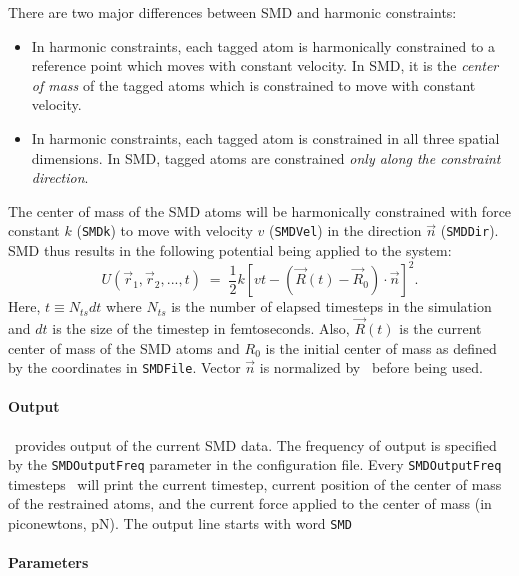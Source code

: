 There are two major differences between SMD and
harmonic constraints:
\begin{itemize}
\item In harmonic constraints, each tagged atom is harmonically constrained
  to a reference point which moves with constant velocity.  In SMD, it is
  the {\em center of mass} of the tagged atoms which is constrained to move
  with constant velocity.

\item In harmonic constraints, each tagged atom is constrained in all three
  spatial dimensions.  In SMD, tagged atoms are constrained {\em only along
  the constraint direction}.
\end{itemize}

The center of mass of the SMD atoms will be harmonically constrained with 
force constant $k$ ({\tt SMDk}) to move with velocity $v$ ({\tt SMDVel}) in 
the direction $\vec n$ ({\tt SMDDir}).  SMD thus results in the following
potential being applied to the system:
\begin{equation}
\label{eq:SMDpotential}
U(\vec r_1, \vec r_2, ..., t) \; = \; \frac{1}{2} 
  k\left[vt - (\vec R(t) - \vec R_0)\cdot \vec n \right]^2.
\end{equation}
Here, $t \equiv N_{ts} dt$ where $N_{ts}$ is the number of elapsed timesteps
in the simulation and $dt$ is the size of the timestep in femtoseconds.
Also, $\vec R(t)$ is the current center of mass of the SMD atoms and $R_0$ is
the initial center of mass as defined by the coordinates in {\tt SMDFile}.
Vector $\vec n$ is normalized by \NAMD\ before being used.  

\paragraph*{Output}

\NAMD\ provides output of the current SMD data. The frequency of
output is specified by the {\tt SMDOutputFreq} parameter in the
configuration file. Every {\tt SMDOutputFreq} timesteps \NAMD\ will
print the current timestep, current position of the center of mass of the
restrained atoms, and
the current force applied to the center of mass (in piconewtons, pN).
The output line starts with word {\tt SMD}

\paragraph*{Parameters}

